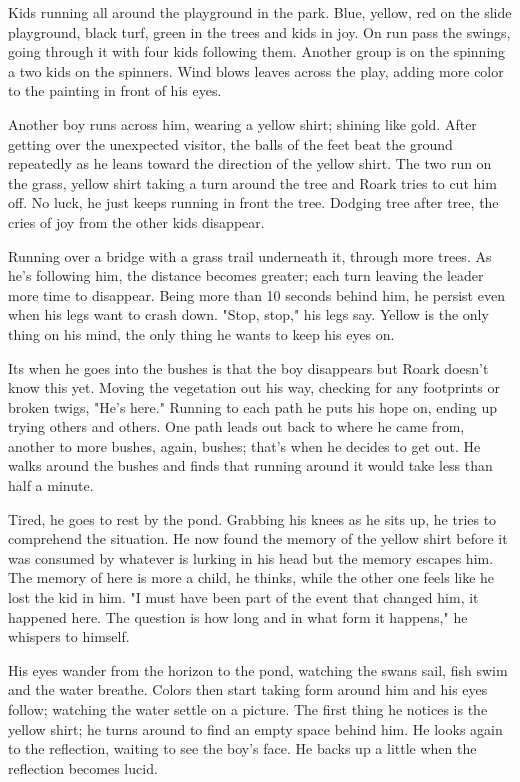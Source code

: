         Kids running all around the playground in the park. Blue, yellow, red on the slide playground, black turf, green in the trees and
    kids in joy. On run pass the swings, going through it with four kids following them. Another group is on the spinning a two kids on the
    spinners. Wind blows leaves across the play, adding more color to the painting in front of his eyes.

        Another boy runs across him, wearing a yellow shirt; shining like gold. After getting over the unexpected visitor, the balls of the
    feet beat the ground repeatedly as he leans toward the direction of the yellow shirt. The two run on the grass, yellow shirt taking a turn
    around the tree and Roark tries to cut him off. No luck, he just keeps running in front the tree. Dodging tree after tree, the cries of
    joy from the other kids disappear.

        Running over a bridge with a grass trail underneath it, through more trees. As he's following him, the distance becomes greater; each 
    turn leaving the leader more time to disappear. Being more than 10 seconds behind him, he persist even when his legs want to crash down.
    "Stop, stop," his legs say. Yellow is the only thing on his mind, the only thing he wants to keep his eyes on. 

        Its when he goes into the bushes is that the boy disappears but Roark doesn't know this yet. Moving the vegetation out his way, checking
    for any footprints or broken twigs, "He's here." Running to each path he puts his hope on, ending up trying others and others. One path leads
    out back to where he came from, another to more bushes, again, bushes; that's when he decides to get out. He walks around the bushes and 
    finds that running around it would take less than half a minute.

       Tired, he goes to rest by the pond. Grabbing his knees as he sits up, he tries to comprehend the situation. He now found the memory of
    the yellow shirt before it was consumed by whatever is lurking in his head but the memory escapes him. The memory of here is more a child,
    he thinks, while the other one feels like he lost the kid in him. "I must have been part of the event that changed him, it happened here.
    The question is how long and in what form it happens," he whispers to himself.

        His eyes wander from the horizon to the pond, watching the swans sail, fish swim and the water breathe. Colors then start taking form
    around him and his eyes follow; watching the water settle on a picture. The first thing he notices is the yellow shirt; he turns around
    to find an empty space behind him. He looks again to the reflection, waiting to see the boy's face. He backs up a little when the reflection
    becomes lucid.

